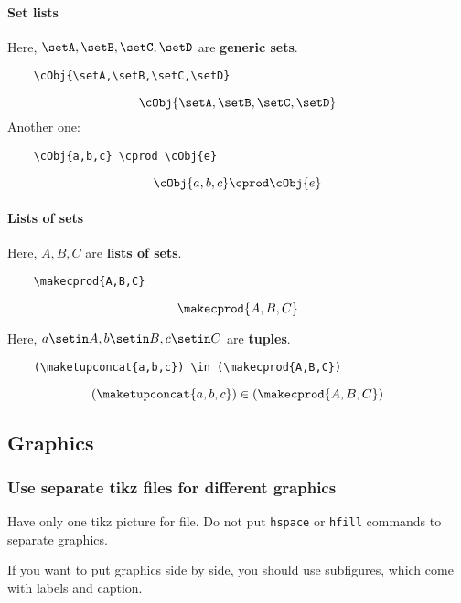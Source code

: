 \paragraph{Set lists}
Here, $\setA, \setB, \setC, \setD$ are \textbf{generic sets}.
\begin{verbatim}
    \cObj{\setA,\setB,\setC,\setD}
\end{verbatim}
\begin{equation}
    \cObj{\setA,\setB,\setC,\setD}
\end{equation}
Another one:
\begin{verbatim}
    \cObj{a,b,c} \cprod \cObj{e}
\end{verbatim}
\begin{equation}
    \cObj{a,b,c} \cprod \cObj{e}
\end{equation}

\paragraph{Lists of sets}
Here, $A, B, C$ are \textbf{lists of sets}.
\begin{verbatim}
    \makecprod{A,B,C}
\end{verbatim}
\begin{equation}
    \makecprod{A,B,C}
\end{equation}

Here, $a \setin A, b \setin B, c \setin C$ are \textbf{tuples}.
\begin{verbatim}
    (\maketupconcat{a,b,c}) \in (\makecprod{A,B,C})
\end{verbatim}
\begin{equation}
    (\maketupconcat{a,b,c})
    \in (\makecprod{A,B,C})
\end{equation}

\vfill\pagebreak

\subsection{Graphics}

\subsubsection*{Use separate tikz files for different graphics}

Have only one tikz picture for file.
Do not put \texttt{hspace} or \texttt{hfill} commands to separate graphics.

If you want to put graphics side by side, you should use subfigures, which come with labels and caption.


